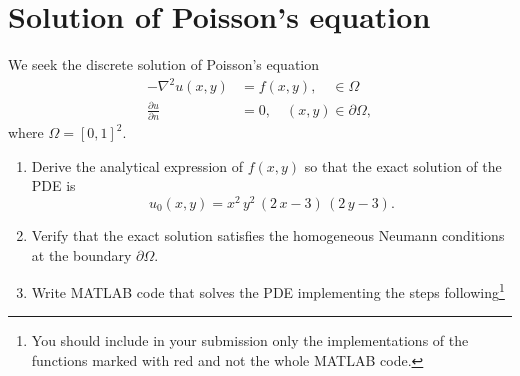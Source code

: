 \documentclass[unicode,11pt,a4paper,oneside,numbers=endperiod,openany]{scrartcl}
\begin{document}
\setassignment
{}


\section*{Solution of Poisson's equation}
We seek the discrete solution of Poisson's equation
\begin{align*}
-\nabla^2 u(x, y) &= f(x,y), \quad \in \Omega \\
\frac{\partial{u}}{\partial n}       &= 0, \quad (x, y) \in \partial \Omega,
\end{align*}
where $\Omega = [0,1]^2$.
\begin{enumerate}
\item Derive the analytical expression of $f(x,y)$ so that the exact 
solution of the PDE is \[u_0(x,y) =x^2\, y^2\, \left(2\, x - 3\right)\, \left(2\, y - 3\right).\] 
\item Verify that the exact solution satisfies the homogeneous Neumann conditions
at the boundary $\partial \Omega$. 
\item Write \small{MATLAB} code that solves the PDE 
implementing the steps following\footnote{ 
You should include in your submission only the implementations of the
functions marked with red and not the whole \small{MATLAB} code.}
\end{enumerate}
\end{document}

